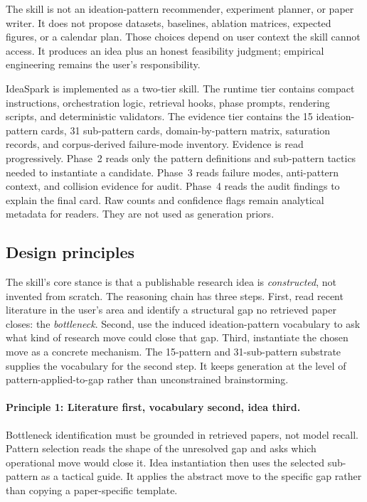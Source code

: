 \documentclass[10pt,a4paper]{article}
\begin{document}
The skill is not an ideation-pattern recommender, experiment planner, or paper writer. It does not propose datasets, baselines, ablation matrices, expected figures, or a calendar plan. Those choices depend on user context the skill cannot access. It produces an idea plus an honest feasibility judgment; empirical engineering remains the user's responsibility.

IdeaSpark is implemented as a two-tier skill. The runtime tier contains compact instructions, orchestration logic, retrieval hooks, phase prompts, rendering scripts, and deterministic validators. The evidence tier contains the 15 ideation-pattern cards, 31 sub-pattern cards, domain-by-pattern matrix, saturation records, and corpus-derived failure-mode inventory. Evidence is read progressively. Phase~2 reads only the pattern definitions and sub-pattern tactics needed to instantiate a candidate. Phase~3 reads failure modes, anti-pattern context, and collision evidence for audit. Phase~4 reads the audit findings to explain the final card. Raw counts and confidence flags remain analytical metadata for readers. They are not used as generation priors.

\subsection{Design principles}
\label{subsec:skill-principles}

The skill's core stance is that a publishable research idea is \emph{constructed}, not invented from scratch. The reasoning chain has three steps. First, read recent literature in the user's area and identify a structural gap no retrieved paper closes: the \emph{bottleneck}. Second, use the induced ideation-pattern vocabulary to ask what kind of research move could close that gap. Third, instantiate the chosen move as a concrete mechanism. The 15-pattern and 31-sub-pattern substrate supplies the vocabulary for the second step. It keeps generation at the level of pattern-applied-to-gap rather than unconstrained brainstorming.

\paragraph{Principle 1: Literature first, vocabulary second, idea third.} Bottleneck identification must be grounded in retrieved papers, not model recall. Pattern selection reads the shape of the unresolved gap and asks which operational move would close it. Idea instantiation then uses the selected sub-pattern as a tactical guide. It applies the abstract move to the specific gap rather than copying a paper-specific template.
\end{document}
